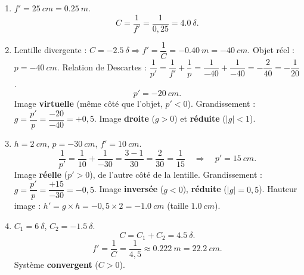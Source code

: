 \documentclass[11pt]{article}
\begin{document}
\begin{corrige}
\begin{enumerate}
    \item $f' = \SI{25}{cm} = \SI{0,25}{m}$.
    \[ C = \frac{1}{f'} = \frac{1}{0,25} = \SI{+4,0}{\delta}. \]
    \item Lentille divergente : $C = \SI{-2,5}{\delta} \Rightarrow f' = \dfrac{1}{C} = \SI{-0,40}{m} = \SI{-40}{cm}$.
    Objet réel : $p = \SI{-40}{cm}$.
    Relation de Descartes : $\dfrac{1}{p'} = \dfrac{1}{f'} + \dfrac{1}{p} = \dfrac{1}{-40} + \dfrac{1}{-40} = -\dfrac{2}{40} = -\dfrac{1}{20}$.
    \[ p' = \SI{-20}{cm}. \]
    Image \textbf{virtuelle} (même côté que l'objet, $p'<0$).
    Grandissement : $g = \dfrac{p'}{p} = \dfrac{-20}{-40} = +0,5$.
    Image \textbf{droite} ($g>0$) et \textbf{réduite} ($|g|<1$).
    \item $h = \SI{2}{cm}$, $p = \SI{-30}{cm}$, $f' = \SI{+10}{cm}$.
    \[ \frac{1}{p'} = \frac{1}{10} + \frac{1}{-30} = \frac{3-1}{30} = \frac{2}{30} = \frac{1}{15} \quad\Rightarrow\quad p' = \SI{+15}{cm}. \]
    Image \textbf{réelle} ($p'>0$), de l'autre côté de la lentille.
    Grandissement : $g = \dfrac{p'}{p} = \dfrac{+15}{-30} = -0,5$.
    Image \textbf{inversée} ($g<0$), \textbf{réduite} ($|g|=0,5$).
    Hauteur image : $h' = g \times h = -0,5 \times 2 = \SI{-1,0}{cm}$ (taille $\SI{1,0}{cm}$).
    \item $C_1 = \SI{+6}{\delta}$, $C_2 = \SI{-1,5}{\delta}$.
    \[ C = C_1 + C_2 = \SI{+4,5}{\delta}. \]
    \[ f' = \frac{1}{C} = \frac{1}{4,5} \approx \SI{0,222}{m} = \SI{22,2}{cm}. \]
    Système \textbf{convergent} ($C>0$).
\end{enumerate}
\end{corrige}
\end{document}
